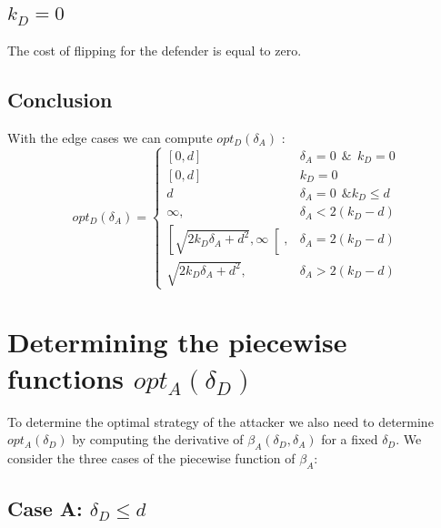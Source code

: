 \subsection*{$k_{D}=0$}
The cost of flipping for the defender is equal to zero. 

\subsection{Conclusion}
With the edge cases we can compute $opt_{D}(\delta_{A})$ : \\

 \begin{displaymath}
  opt_{D}(\delta_{A}) = \left\{
     \begin{array}{lr}
     \left[0,d\right] & \delta_{A} =0 ~~\& ~~k_{D}=0 \\
     \left[0,d\right] & k_{D}=0\\
     d & \delta_{A} =0 ~~ \& k_{D} \leq d\\
          \infty , & \delta_{A} < 2(k_{D} - d)\\
      \left[ \sqrt{2k_{D}\delta_{A} + d^{2}},\infty\right[ , & \delta_{A} = 2(k_{D} - d) \\
      \sqrt{2k_{D}\delta_{A} + d^{2}}, & \delta_{A} > 2(k_{D} - d)
     \end{array}
   \right.
\end{displaymath}
%
%
\section{Determining the piecewise functions $opt_{A}(\delta_{D})$}
To determine the optimal strategy of the attacker we also need to determine $opt_{A}(\delta_{D})$ by computing the derivative of $\beta_{A}(\delta_{D},\delta_{A})$ for a fixed $\delta_{D}$. We consider the three cases of the piecewise function of $\beta_{A}$: \\


\subsection*{Case A: $\delta_{D} \leq d$}

